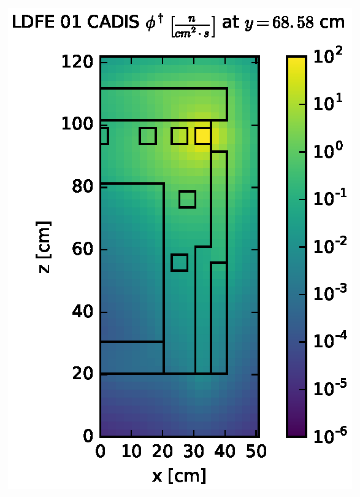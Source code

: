 \begin{figure}[!htb]
\begin{subfigure}{0.4\textwidth}
\includegraphics[max height=0.445\textheight]
{img/dlvn-plots/cad-adj/flux-ldfe01-slice.eps}
\end{subfigure} ~
\begin{subfigure}{0.4\textwidth}

\end{subfigure}
\end{figure}
